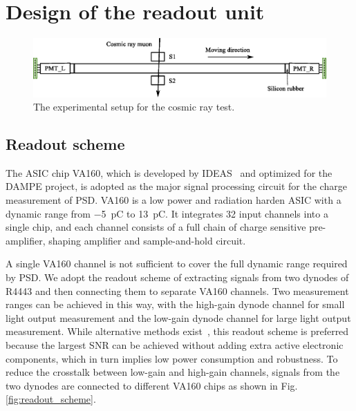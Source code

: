 \documentclass[5p, times]{elsarticle}
\begin{document}
\section{Design of the readout unit}
\label{sec:design}
\begin{figure}[b]
 \centering
 \includegraphics[width=130mm]{cosmic_test}
\caption{The experimental setup for the cosmic ray test.}
\label{fig:cosmic_test}
\end{figure} 

\subsection{Readout scheme}
\label{sec:scheme}
The ASIC chip VA160, which is developed by IDEAS~\cite{va160} and optimized for the DAMPE project, is adopted as the major signal processing circuit for the charge measurement of PSD.
VA160 is a low power and radiation harden ASIC with a dynamic range from \SI{-5}{\pico\coulomb} to \SI{13}{\pico\coulomb}. 
It integrates 32 input channels into a single chip, and each channel consists of a full chain of charge sensitive pre-amplifier, shaping amplifier and sample-and-hold circuit.

A single VA160 channel is not sufficient to cover the full dynamic range required by PSD.
We adopt the readout scheme of extracting signals from two dynodes of R4443 and then connecting them to separate VA160 channels.
Two measurement ranges can be achieved in this way, with the high-gain dynode channel for small light output measurement and the low-gain dynode channel for large light output measurement.
While alternative methods exist~\cite{katayose2008development,kampert1994high,genolini_low_2003}, this readout scheme is preferred because the largest SNR can be achieved without adding extra active electronic components, which in turn implies low power consumption and robustness.
To reduce the crosstalk between low-gain and high-gain channels, signals from the two dynodes are connected to different VA160 chips as shown in Fig.\ref{fig:readout_scheme}.
\end{document}
